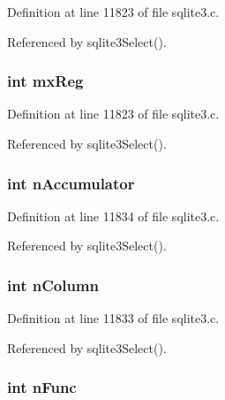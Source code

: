Definition at line 11823 of file sqlite3.\+c.



Referenced by sqlite3\+Select().

\hypertarget{struct_agg_info_aef604a80ab7d118d0a845d1e2e2ad07f}{}
\subsubsection[{mx\+Reg}]{\setlength{\rightskip}{0pt plus 5cm}int mx\+Reg}\label{struct_agg_info_aef604a80ab7d118d0a845d1e2e2ad07f}


Definition at line 11823 of file sqlite3.\+c.



Referenced by sqlite3\+Select().

\hypertarget{struct_agg_info_a25984684dced6d2dd6b199ba9d313874}{}
\subsubsection[{n\+Accumulator}]{\setlength{\rightskip}{0pt plus 5cm}int n\+Accumulator}\label{struct_agg_info_a25984684dced6d2dd6b199ba9d313874}


Definition at line 11834 of file sqlite3.\+c.



Referenced by sqlite3\+Select().

\hypertarget{struct_agg_info_a7234b16e113cc77e0d6720214ff35508}{}
\subsubsection[{n\+Column}]{\setlength{\rightskip}{0pt plus 5cm}int n\+Column}\label{struct_agg_info_a7234b16e113cc77e0d6720214ff35508}


Definition at line 11833 of file sqlite3.\+c.



Referenced by sqlite3\+Select().

\hypertarget{struct_agg_info_a1a96e533b0a914bddce66c2e19fedcb4}{}
\subsubsection[{n\+Func}]{\setlength{\rightskip}{0pt plus 5cm}int n\+Func}\label{struct_agg_info_a1a96e533b0a914bddce66c2e19fedcb4}


